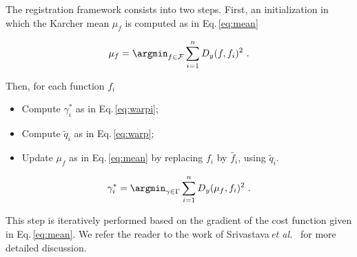 The registration framework consists into two steps. First, an initialization in which the Karcher mean $\mu_f$ is computed as in Eq.\,\ref{eq:mean}

\begin{equation}
  \mu_f = \argmin_{f \in \mathcal{F}} \sum_{i = 1}^{n} D_y(f, f_i)^2 \ .
  \label{eq:mean}
\end{equation}

Then, for each function $f_i$
\begin{itemize}
\item Compute $\gamma_{i}^{*}$ as in Eq.\,\ref{eq:warpi};
\item Compute $\tilde{q}_i$ as in Eq.\,\ref{eq:warp};
\item Update $\mu_f$ as in Eq.\,\ref{eq:mean} by replacing $f_i$ by $\tilde{f_i}$, using $\tilde{q}_i$.
\end{itemize}

\begin{equation}
  \gamma_{i}^{*} = \argmin_{\gamma \in \Gamma} \sum_{i = 1}^{n} D_y(\mu_f, f_i)^2 \ .
  \label{eq:warpi}
\end{equation}

This step is iteratively performed based on the gradient of the cost function given in Eq.\,\ref{eq:mean}. We refer the reader to the work of Srivastava\,\textit{et al.}~\cite{Srivastava2011} for more detailed discussion.


